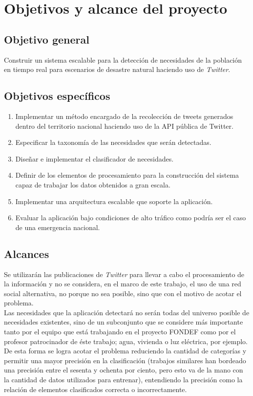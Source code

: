 \section{Objetivos y alcance del proyecto}
\label{intro:objetivos}

\subsection{Objetivo general}
	Construir un sistema escalable para la detección de necesidades de la población en tiempo real para escenarios de desastre natural haciendo uso de \textit{Twitter}.

\subsection{Objetivos espec\'ificos}
\begin{enumerate}
\item	Implementar un método encargado de la recolección de tweets generados dentro del territorio nacional haciendo uso de la API pública de Twitter.
\item	Especificar la taxonomía de las necesidades que serán detectadas.
\item	Diseñar e implementar el clasificador de necesidades.
\item	Definir de los elementos de procesamiento para la construcción del sistema capaz de trabajar los datos obtenidos a gran escala.
\item	Implementar una arquitectura escalable que soporte la aplicación.
\item	Evaluar la aplicación bajo condiciones de alto tráfico como podría ser el caso de una emergencia nacional.
\end{enumerate}

\subsection{Alcances}
Se utilizarán las publicaciones de \textit{Twitter} para llevar a cabo el procesamiento de la información y no se considera, en el marco de este trabajo, el uso de una red social alternativa, no porque no sea posible, sino que con el motivo de acotar el problema.\\

Las necesidades que la aplicación detectará no serán todas del universo posible de necesidades existentes, sino de un subconjunto que se considere más importante tanto por el equipo que está trabajando en el proyecto FONDEF como por el profesor patrocinador de éste trabajo; agua, vivienda o luz eléctrica, por ejemplo. De esta forma se logra acotar el problema reduciendo la cantidad de categorías y permitir una mayor precisión en la clasificación (trabajos similares han bordeado una precisión entre el sesenta y ochenta por ciento, pero esto va de la mano con la cantidad de datos utilizados para entrenar), entendiendo la precisión como la relación de elementos clasificados correcta o incorrectamente.\\

